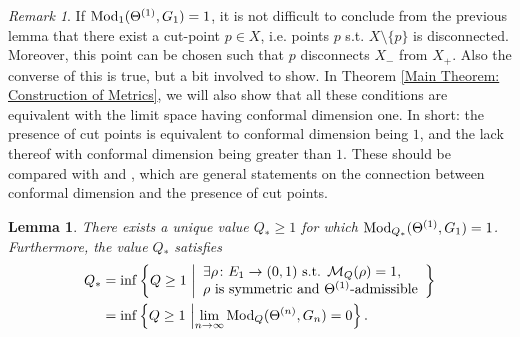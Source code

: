 \documentclass{amsart}
\newcommand{\Mod}{{\rm Mod}}
\newtheorem{lemma}[equation]{Lemma}
\numberwithin{equation}{section}
\theoremstyle{definition}
\theoremstyle{remark}
\newtheorem{remark}[equation]{Remark}
\newcommand{\cM}{\mathcal{M}}
\begin{document}
\begin{remark}
    If $\Mod_1(\Theta^{(1)},G_1)=1$, it is not difficult to conclude from the previous lemma that there exist a cut-point $p\in X$, i.e. points $p$ s.t. $X\setminus \{p\}$ is disconnected. Moreover, this point can be chosen such that $p$ disconnects $X_-$ from $X_+$. Also the converse of this is true, but a bit involved to show. In Theorem \ref{Main Theorem: Construction of Metrics}, we will also show that all these conditions are equivalent with the limit space having conformal dimension one. In short: the presence of cut points is equivalent to conformal dimension being $1$, and the lack thereof with conformal dimension being greater than $1$. These should be compared with \cite[Theorem 1.2]{carrascosplitting} and \cite[Corollary 1.2]{mckaydimone}, which are general statements on the connection between  conformal dimension and the presence of cut points.
\end{remark}


\begin{lemma}\label{Lemma: Critical exponent}
    There exists a unique value \(Q_*\geq 1\) for which \(\Mod_{Q_*}(\Theta^{(1)},G_1)=1\). Furthermore, the value \(Q_*\) satisfies
        \[
        \begin{split}
            Q_*&=\inf
            \left\{
                Q\geq1\ \middle\vert
                \begin{array}{l}
                    \exists \rho\colon E_1\to(0,1) \text{ s.t. } \cM_Q(\rho)=1,\\ \rho \text{ is symmetric and }\Theta^{(1)}\text{-admissible}
                \end{array}
            \right\}\\
            &=\inf\left\{ Q\geq 1\ \middle\vert \lim_{n\to\infty}\Mod_Q(\Theta^{(n)},G_n)=0\right\}.
        \end{split}
        \]
\end{lemma}
\end{document}
